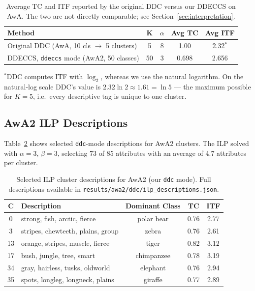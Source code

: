 \begin{table}[H]
    \centering
    \caption{Average TC and ITF reported by the original DDC versus our DDECCS on AwA. The two are not directly comparable; see Section~\ref{sec:interpretation}.}
    \label{tab:ddc_tcitf}
    \begin{tabular}{lcccc}
        \hline
        \textbf{Method} & \textbf{K} & \textbf{$\alpha$} & \textbf{Avg TC} & \textbf{Avg ITF} \\
        \hline
        Original DDC (AwA, 10 cls $\to$ 5 clusters) & 5 & 8 & 1.00 & 2.32$^{*}$ \\
        DDECCS, \texttt{ddeccs} mode (AwA2, 50 classes) & 50 & 3 & 0.698 & 2.656 \\
        \hline
    \end{tabular}

    \vspace{2pt}
    {\footnotesize $^{*}$DDC computes ITF with $\log_2$, whereas we use the natural logarithm. On the natural-log scale DDC's value is $2.32\ln 2 \approx 1.61 = \ln 5$ --- the maximum possible for $K=5$, i.e.\ every descriptive tag is unique to one cluster.}
\end{table}

\subsection{AwA2 ILP Descriptions}

Table~\ref{tab:awa2_descriptions} shows selected \texttt{ddc}-mode descriptions for AwA2 clusters. The ILP solved with $\alpha = 3$, $\beta = 3$, selecting 73 of 85 attributes with an average of 4.7 attributes per cluster.

\begin{table}[H]
    \centering
    \caption{Selected ILP cluster descriptions for AwA2 (our \texttt{ddc} mode). Full descriptions available in \texttt{results/awa2/ddc/ilp\_descriptions.json}.}
    \label{tab:awa2_descriptions}
    \begin{tabular}{clccc}
        \hline
        \textbf{C} & \textbf{Description} & \textbf{Dominant Class} & \textbf{TC} & \textbf{ITF} \\
        \hline
        0 & strong, fish, arctic, fierce & polar bear & 0.76 & 2.77 \\
        3 & stripes, chewteeth, plains, group & zebra & 0.76 & 2.61 \\
        13 & orange, stripes, muscle, fierce & tiger & 0.82 & 3.12 \\
        17 & bush, jungle, tree, smart & chimpanzee & 0.78 & 3.19 \\
        34 & gray, hairless, tusks, oldworld & elephant & 0.76 & 2.94 \\
        35 & spots, longleg, longneck, plains & giraffe & 0.77 & 2.89 \\
        \hline
    \end{tabular}
\end{table}

